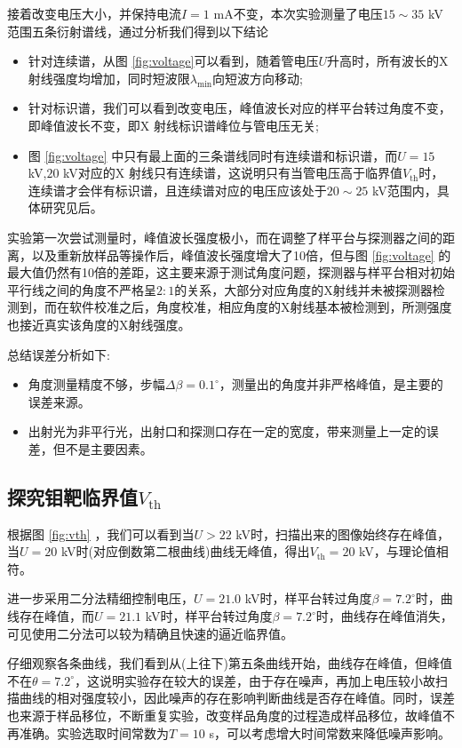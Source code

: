 \documentclass{whureport}
\begin{document}
\begin{multicols}{2}
	接着改变电压大小，并保持电流$I=1$ mA不变，本次实验测量了电压$15\sim35$ kV范围五条衍射谱线，通过分析我们得到以下结论
	\begin{itemize}
		\item 针对连续谱，从图 \ref{fig:voltage}可以看到，随着管电压$U$升高时，所有波长的X射线强度均增加，同时短波限$\lambda_{\min}$向短波方向移动;
		\item 针对标识谱，我们可以看到改变电压，峰值波长对应的样平台转过角度不变，即峰值波长不变，即X 射线标识谱峰位与管电压无关;
		\item 图 \ref{fig:voltage} 中只有最上面的三条谱线同时有连续谱和标识谱，而$U=15$ kV,$20$ kV对应的X 射线只有连续谱，这说明只有当管电压高于临界值$V_{\text{th}}$时，连续谱才会伴有标识谱，且连续谱对应的电压应该处于$20\sim25$ kV范围内，具体研究见后。
	\end{itemize}
	
	实验第一次尝试测量时，峰值波长强度极小，而在调整了样平台与探测器之间的距离，以及重新放样品等操作后，峰值波长强度增大了10倍，但与图 \ref{fig:voltage} 的最大值仍然有10倍的差距，这主要来源于测试角度问题，探测器与样平台相对初始平行线之间的角度不严格呈$2:1$的关系，大部分对应角度的X射线并未被探测器检测到，而在软件校准之后，角度校准，相应角度的X射线基本被检测到，所测强度也接近真实该角度的X射线强度。
	
	总结误差分析如下:
	\begin{itemize}
		\item 角度测量精度不够，步幅$\Delta\beta=0.1^\circ$，测量出的角度并非严格峰值，是主要的误差来源。
		\item 出射光为非平行光，出射口和探测口存在一定的宽度，带来测量上一定的误差，但不是主要因素。
	\end{itemize}
	\subsection{探究钼靶临界值$V_{\text{th}}$}
	根据图 \ref{fig:vth} ，我们可以看到当$U>22$ kV时，扫描出来的图像始终存在峰值，当$U=20$ kV时(对应倒数第二根曲线)曲线无峰值，得出$V_{\text{th}}=20$ kV，与理论值相符。

	进一步采用二分法精细控制电压，$U=21.0$ kV时，样平台转过角度$\beta=7.2^\circ$时，曲线存在峰值，而$U=21.1$ kV时，样平台转过角度$\beta=7.2^\circ$时，曲线存在峰值消失，可见使用二分法可以较为精确且快速的逼近临界值。
	
	仔细观察各条曲线，我们看到从(上往下)第五条曲线开始，曲线存在峰值，但峰值不在$\theta=7.2^\circ$，这说明实验存在较大的误差，由于存在噪声，再加上电压较小故扫描曲线的相对强度较小，因此噪声的存在影响判断曲线是否存在峰值。同时，误差也来源于样品移位，不断重复实验，改变样品角度的过程造成样品移位，故峰值不再准确。实验选取时间常数为$T=10$ s，可以考虑增大时间常数来降低噪声影响。

\end{multicols}
\end{document}
